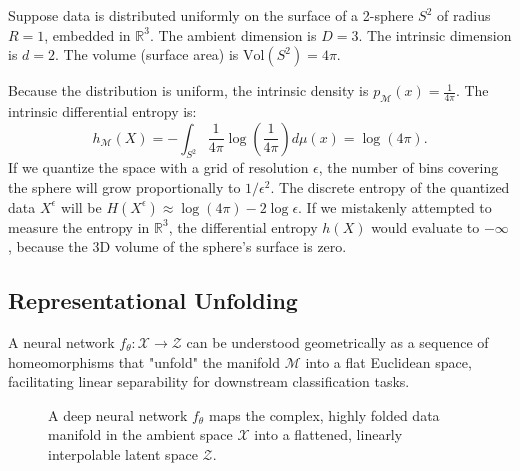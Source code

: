 Suppose data is distributed uniformly on the surface of a 2-sphere $S^2$ of radius $R=1$, embedded in $\mathbb{R}^3$. The ambient dimension is $D=3$. The intrinsic dimension is $d=2$. The volume (surface area) is $\text{Vol}(S^2) = 4\pi$.

Because the distribution is uniform, the intrinsic density is $p_{\mathcal{M}}(x) = \frac{1}{4\pi}$. The intrinsic differential entropy is:
\begin{equation}
    h_{\mathcal{M}}(X) = - \int_{S^2} \frac{1}{4\pi} \log \left(\frac{1}{4\pi}\right) d\mu(x) = \log(4\pi).
\end{equation}
If we quantize the space with a grid of resolution $\epsilon$, the number of bins covering the sphere will grow proportionally to $1/\epsilon^2$. The discrete entropy of the quantized data $X^\epsilon$ will be $H(X^\epsilon) \approx \log(4\pi) - 2 \log \epsilon$. If we mistakenly attempted to measure the entropy in $\mathbb{R}^3$, the differential entropy $h(X)$ would evaluate to $-\infty$, because the 3D volume of the sphere's surface is zero.

\subsection{Representational Unfolding}

A neural network $f_\theta: \mathcal{X} \to \mathcal{Z}$ can be understood geometrically as a sequence of homeomorphisms that "unfold" the manifold $\mathcal{M}$ into a flat Euclidean space, facilitating linear separability for downstream classification tasks.

\begin{figure}[ht]
    \centering
    \caption{A deep neural network $f_\theta$ maps the complex, highly folded data manifold in the ambient space $\mathcal{X}$ into a flattened, linearly interpolable latent space $\mathcal{Z}$.}
    \label{fig:manifold_unfolding}
\end{figure}

